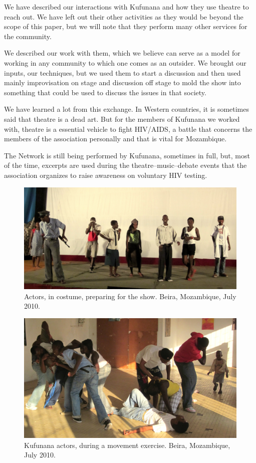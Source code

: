 \documentclass[article,twocolumn]{memoir}
\begin{document}
We have described our interactions with Kufunana and how they use theatre to
reach out. We have left out their other activities as they would be beyond the
scope of this paper, but we will note that they perform many other services for
the community.

We described our work with them, which we believe can serve as a model for
working in any community to which one comes as an outsider. We brought our
inputs, our techniques, but we used them to start a discussion and then used
mainly improvisation on stage and discussion off stage to mold the show into
something that could be used to discuss the issues in that society.

We have learned a lot from this exchange. In Western countries, it is sometimes
said that theatre is a dead art. But for the members of Kufunana we worked
with, theatre is a essential vehicle to fight HIV/AIDS, a battle that concerns
the members of the association personally and that is vital for Mozambique.

The Network is still being performed by Kufunana, sometimes in full, but, most
of the time, excerpts are used during the theatre--music--debate events that
the association organizes to raise awareness on voluntary HIV testing.

\begin{figure}[b]
\begin{center}
\includegraphics[width=.9\textwidth]{photographs/actors.jpg}
\end{center}
\caption{Actors, in costume, preparing for the show. Beira, Mozambique, July 2010.}
\label{fig:actors}
\end{figure}


\begin{figure}[b]
\begin{center}
\includegraphics[width=.9\textwidth]{photographs/exercises.jpg}
\end{center}
\caption{Kufunana actors, during a movement exercise. Beira, Mozambique, July 2010.}
\label{fig:exercise}
\end{figure}
\end{document}
